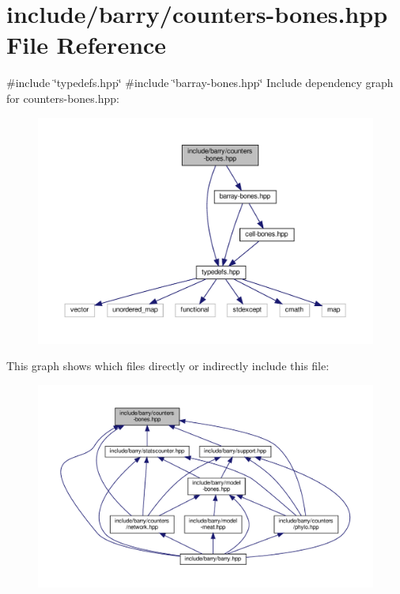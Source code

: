 \hypertarget{counters-bones_8hpp}{}\section{include/barry/counters-\/bones.hpp File Reference}
\label{counters-bones_8hpp}
{\ttfamily \#include \char`\"{}typedefs.\+hpp\char`\"{}}\newline
{\ttfamily \#include \char`\"{}barray-\/bones.\+hpp\char`\"{}}\newline
Include dependency graph for counters-\/bones.hpp\+:
\nopagebreak
\begin{figure}[H]
\begin{center}
\leavevmode
\includegraphics[width=350pt]{counters-bones_8hpp__incl}
\end{center}
\end{figure}
This graph shows which files directly or indirectly include this file\+:
\nopagebreak
\begin{figure}[H]
\begin{center}
\leavevmode
\includegraphics[width=350pt]{counters-bones_8hpp__dep__incl}
\end{center}
\end{figure}
